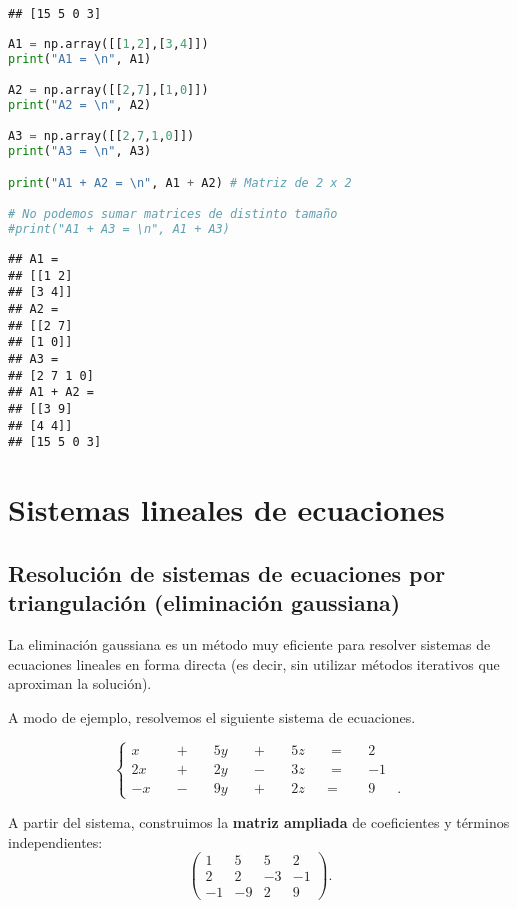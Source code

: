 \begin{verbatim}
## [15 5 0 3]
\end{verbatim}

\begin{Shaded}
\begin{lstlisting}[language=python]
A1 = np.array([[1,2],[3,4]])
print("A1 = \n", A1)

A2 = np.array([[2,7],[1,0]])
print("A2 = \n", A2)

A3 = np.array([[2,7,1,0]])
print("A3 = \n", A3)

print("A1 + A2 = \n", A1 + A2) # Matriz de 2 x 2

# No podemos sumar matrices de distinto tamaño
#print("A1 + A3 = \n", A1 + A3)
\end{lstlisting}
\end{Shaded}

\begin{verbatim}
## A1 =
## [[1 2]
## [3 4]]
## A2 =
## [[2 7]
## [1 0]]
## A3 =
## [2 7 1 0]
## A1 + A2 =
## [[3 9]
## [4 4]]
## [15 5 0 3]
\end{verbatim}

\section{Sistemas lineales de ecuaciones}

\subsection{Resolución de sistemas de ecuaciones por triangulación (eliminación gaussiana)}

La eliminación gaussiana es un método muy eficiente para resolver sistemas de ecuaciones lineales en forma directa (es decir, sin utilizar métodos iterativos que aproximan la solución).

A modo de ejemplo, resolvemos el siguiente sistema de ecuaciones.

$$
\left\{ {\begin{alignedat}{7}
x&&\;+\;&&5y&&\;+\;&&5z&&\;=\;&&2&\\
2x&&\;+\;&&2y&&\;-\;&&3z&&\;=\;&&-1&\\
-x&&\;-\;&&9y&&\;+\;&&2z&&=\;&&9&.
\end{alignedat}} \right.
$$

A partir del sistema, construimos la \textbf{matriz ampliada} de coeficientes y términos independientes:
$$
\left(
\begin{array}{rrr|r}1&5&5&2\\2&2&-3&-1\\-1&-9&2&9\end{array}
\right).
$$

